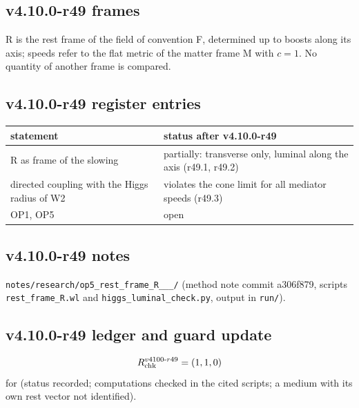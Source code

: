 \subsection*{v4.10.0-r49 frames}
\label{subsec:v4100-r49-frames}

R is the rest frame of the field of convention F, determined up to boosts along its axis; speeds refer to the flat metric of the matter frame M with
\(c=1\).  No quantity of another frame is compared.

\subsection*{v4.10.0-r49 register entries}
\label{subsec:v4100-r49-register}

\begin{center}
\small
\begin{tabular}{@{}>{\raggedright\arraybackslash}p{}>{\raggedright\arraybackslash}p{}@{}}
\toprule
statement & status after v4.10.0-r49\\
\midrule
R as frame of the slowing & partially: transverse only, luminal along the axis (r49.1, r49.2)\\
directed coupling with the Higgs radius of W2 & violates the cone limit for all mediator speeds (r49.3)\\
OP1, OP5 & open\\
\bottomrule
\end{tabular}
\end{center}

\subsection*{v4.10.0-r49 notes}
\label{subsec:v4100-r49-notes}

\texttt{notes/\allowbreak research/\allowbreak op5\_\allowbreak rest\_\allowbreak frame\_\allowbreak R\_\_\_/} (method note commit a306f879,
scripts \texttt{rest\_\allowbreak frame\_\allowbreak R.wl} and \texttt{higgs\_\allowbreak luminal\_\allowbreak check.py}, output in \texttt{run/}).

\subsection*{v4.10.0-r49 ledger and guard update}
\label{subsec:v4100-r49-ledger-guard}

\[
R_{\rm chk}^{v4100\text{-}r49}=(1,1,0)
\]
for (status recorded; computations checked in the cited scripts; a medium with its own rest vector not identified).

